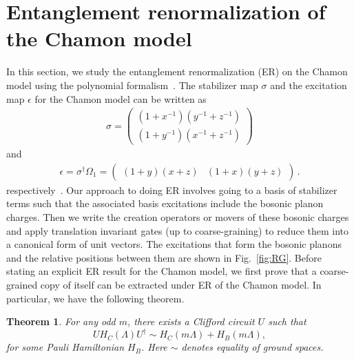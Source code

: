 \documentclass[prx,twocolumn,superscriptaddress,nofootinbib,showpacs,notitlepage]{revtex4-2}
\newtheorem{theorem}{Theorem}[section]
\newcommand{\Chamon}{Chamon }
\begin{document}
\section{Entanglement renormalization of the \Chamon model}
\label{app:proof}
In this section, we study the entanglement renormalization (ER) on the \Chamon model using the polynomial formalism~\cite{haah2013commuting,haah2014bifurcation}. The stabilizer map $\sigma$ and the excitation map $\epsilon$ for the \Chamon model can be written as 
\begin{eqnarray}
  \sigma=  \left(\begin{array}{cccc}
         (1+x^{-1})(y^{-1}+z^{-1})\\
         (1+y^{-1})(x^{-1}+z^{-1})
    \end{array}
    \right)
    \label{Chamon_code}
\end{eqnarray}
and
\begin{eqnarray}
  \epsilon= \sigma^\dagger \Omega_1= \left(\begin{array}{cccc}
         (1+y)(x+z)& (1+x)(y+z)
    \end{array}
    \right) \, .
    \label{Chamon_exc_map}
\end{eqnarray}
respectively~\cite{haah2013commuting}. Our approach to doing ER involves going to a basis of stabilizer terms such that the associated basis excitations include the bosonic planon charges. Then we write the creation operators or movers of these bosonic charges and apply translation invariant gates (up to coarse-graining) to reduce them into a canonical form of unit vectors. The excitations that form the bosonic planons and the relative positions between them are shown in Fig.~\ref{fig:RG}.
Before stating an explicit ER result for the \Chamon model, we first prove that a coarse-grained copy of itself can be extracted under ER of the \Chamon model. %
In particular, we have the following theorem.

\begin{theorem}
For any odd $m$, there exists a Clifford circuit $U$ such that
\begin{equation}
    UH_C(\Lambda)U^\dagger\sim H_C(m\Lambda)+H_B(m\Lambda),
\end{equation}
for some Pauli Hamiltonian $H_B$. Here $\sim$ denotes equality of ground spaces.
\label{thm:ERG_Chamon}
\end{theorem}

\end{document}

